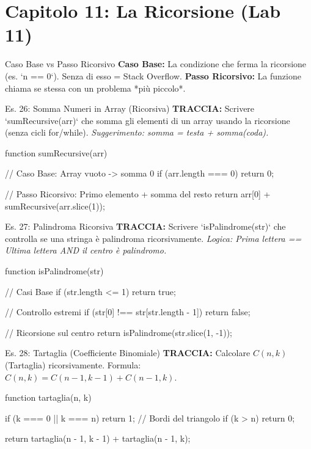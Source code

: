 \section{Capitolo 11: La Ricorsione (Lab 11)}

\begin{dizionario}{Caso Base vs Passo Ricorsivo}
\textbf{Caso Base:} La condizione che ferma la ricorsione (es. `n == 0`). Senza di esso = Stack Overflow.
\textbf{Passo Ricorsivo:} La funzione chiama se stessa con un problema *più piccolo*.
\end{dizionario}

\begin{esercizio}{Es. 26: Somma Numeri in Array (Ricorsiva)}
\textbf{TRACCIA:} Scrivere `sumRecursive(arr)` che somma gli elementi di un array usando la ricorsione (senza cicli for/while).
\textit{Suggerimento: somma = testa + somma(coda).}
\end{esercizio}

\begin{jsbox}
function sumRecursive(arr) {
    // Caso Base: Array vuoto -> somma 0
    if (arr.length === 0) return 0;
    
    // Passo Ricorsivo: Primo elemento + somma del resto
    return arr[0] + sumRecursive(arr.slice(1));
}
\end{jsbox}

\begin{esercizio}{Es. 27: Palindroma Ricorsiva}
\textbf{TRACCIA:} Scrivere `isPalindrome(str)` che controlla se una stringa è palindroma ricorsivamente.
\textit{Logica: Prima lettera == Ultima lettera AND il centro è palindromo.}
\end{esercizio}

\begin{jsbox}
function isPalindrome(str) {
    // Casi Base
    if (str.length <= 1) return true;
    
    // Controllo estremi
    if (str[0] !== str[str.length - 1]) return false;
    
    // Ricorsione sul centro
    return isPalindrome(str.slice(1, -1));
}
\end{jsbox}

\begin{esercizio}{Es. 28: Tartaglia (Coefficiente Binomiale)}
\textbf{TRACCIA:} Calcolare $C(n, k)$ (Tartaglia) ricorsivamente.
Formula: $C(n, k) = C(n-1, k-1) + C(n-1, k)$.
\end{esercizio}

\begin{jsbox}
function tartaglia(n, k) {
    if (k === 0 || k === n) return 1; // Bordi del triangolo
    if (k > n) return 0;
    
    return tartaglia(n - 1, k - 1) + tartaglia(n - 1, k);
}
\end{jsbox}
